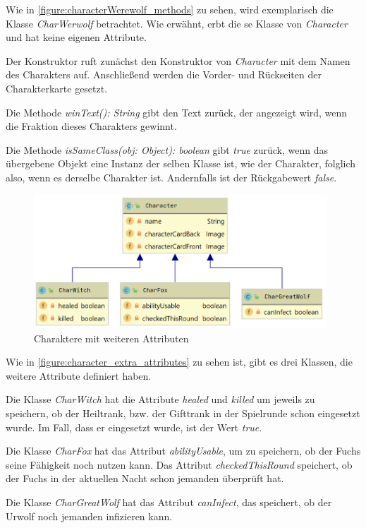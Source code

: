 Wie in \autoref{figure:characterWerewolf_methods} zu sehen, wird exemplarisch die Klasse \textit{CharWerwolf} betrachtet. 
Wie erwähnt, erbt die se Klasse von \textit{Character} und hat keine eigenen Attribute. 

\medskip
Der Konstruktor ruft zunächst den Konstruktor von \textit{Character} mit dem Namen des Charakters auf. Anschließend werden die Vorder- und Rückseiten der Charakterkarte gesetzt. 

\medskip
Die Methode \textit{winText(): String} gibt den Text zurück, der angezeigt wird, wenn die Fraktion dieses Charakters gewinnt. 

\medskip
Die Methode \textit{isSameClass(obj: Object): boolean} gibt \textit{true} zurück, wenn das übergebene Objekt eine Instanz der selben Klasse ist, wie der Charakter, folglich also, wenn es derselbe Charakter ist. Andernfalls ist der Rückgabewert \textit{false}. 

\begin{figure}[H]
	\centering
	\includegraphics[width=11cm]{architektur/character_extra_attributes.png}
	\caption{Charaktere mit weiteren Attributen}
	\label{figure:character_extra_attributes}
\end{figure}

Wie in \autoref{figure:character_extra_attributes} zu sehen ist, gibt es drei Klassen, die weitere Attribute definiert haben. 

\medskip
Die Klasse \textit{CharWitch} hat die Attribute \textit{healed} und \textit{killed} um jeweils zu speichern, ob der Heiltrank, bzw. der Gifttrank in der Spielrunde schon eingesetzt wurde. Im Fall, dass er eingesetzt wurde, ist der Wert \textit{true}. 

\medskip
Die Klasse \textit{CharFox} hat das Attribut \textit{abilityUsable}, um zu speichern, ob der Fuchs seine Fähigkeit noch nutzen kann. Das Attribut \textit{checkedThisRound} speichert, ob der Fuchs in der aktuellen Nacht schon jemanden überprüft hat. 

\medskip
Die Klasse \textit{CharGreatWolf} hat das Attribut \textit{canInfect}, das speichert, ob der Urwolf noch jemanden infizieren kann. 

